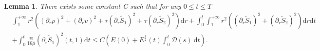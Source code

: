 \documentclass[10pt,reqno]{amsart}
\numberwithin{equation}{section}
\newtheorem{lemma}[theorem]{Lemma}
\begin{document}
	\begin{lemma}\label{lem2-1}
		There exists some constant C such that for any $0\leq t \leq T$
		\begin{equation}
			\begin{aligned}
				&\int_{1}^{+\infty}  r^2\left((\partial_{r}\rho)^2+(\partial_{r}v)^2
				+\tau  (\partial_{r}\tilde{S}_1)^2+\tau (\partial_{r}\tilde{S}_2)^2\right)\mathrm{d}r
				+ \int_0^t \int_{1}^{+\infty}r^2\left(  (\partial_{r}\tilde{S}_1)^2+ (\partial_{r}\tilde{S}_2)^2\right)\mathrm{d}r\mathrm{d}t\\
				&+\int_{0}^{t}\frac{\tau\epsilon}{16\mu}(\partial_{r}\tilde{S}_1)^2(t,1)\mathrm{d}t
				\leq C\left(E(0)+ E^{\frac{1}{2}}(t) \int_{0}^{t}\mathcal{D}(s)\mathrm{~d} t\right)
				.	
			\end{aligned}
		\end{equation}
	\end{lemma}
\end{document}
